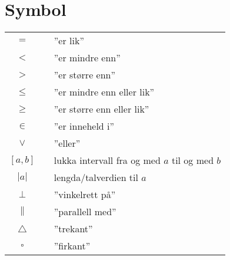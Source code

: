 



\section*{Symbol} \label{Symbol}
\renewcommand{\arraystretch}{1.2}
\begin{tabular}{@{}cp{0.4cm}l}
$ = $ && ''er lik'' \\
$ < $ && ''er mindre enn'' \\
$ > $ && ''er større enn'' \\
$ \leq $ && ''er mindre enn eller lik'' \\
$ \geq $ && ''er større enn eller lik'' \\		
$ \in $ && ''er inneheld i'' \\
$ \vee $&&''eller''\\
$ [a, b] $ && lukka intervall fra og med $ a $ til og med $ b $\\
$|a| $ &&  lengda/talverdien til $ a $\\
$\perp $ &&  ''vinkelrett på'' \\
$\parallel $ &&  ''parallell med'' \\
$\triangle $ &&  ''trekant'' \\
$\square $ &&  ''firkant'' \\

\end{tabular}
\renewcommand{\arraystretch}{1}

